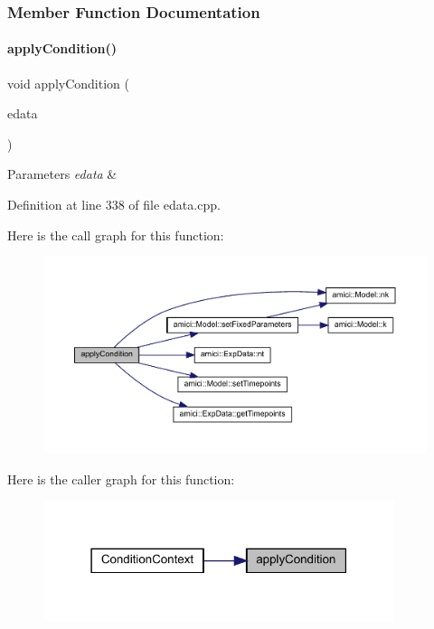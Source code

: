 \subsubsection{Member Function Documentation}
\mbox{\label{classamici_1_1_condition_context_a3afbbd4b46cbd46cbc07960705492843}} 
\paragraph{\texorpdfstring{applyCondition()}{applyCondition()}}
{\footnotesize\ttfamily void apply\+Condition (\begin{DoxyParamCaption}\item[{const \mbox{\hyperlink{classamici_1_1_exp_data}{Exp\+Data}} $\ast$}]{edata }\end{DoxyParamCaption})}


\begin{DoxyParams}{Parameters}
{\em edata} & \\
\hline
\end{DoxyParams}


Definition at line 338 of file edata.\+cpp.

Here is the call graph for this function\+:
\nopagebreak
\begin{figure}[H]
\begin{center}
\leavevmode
\includegraphics[width=350pt]{classamici_1_1_condition_context_a3afbbd4b46cbd46cbc07960705492843_cgraph}
\end{center}
\end{figure}
Here is the caller graph for this function\+:
\nopagebreak
\begin{figure}[H]
\begin{center}
\leavevmode
\includegraphics[width=291pt]{classamici_1_1_condition_context_a3afbbd4b46cbd46cbc07960705492843_icgraph}
\end{center}
\end{figure}
